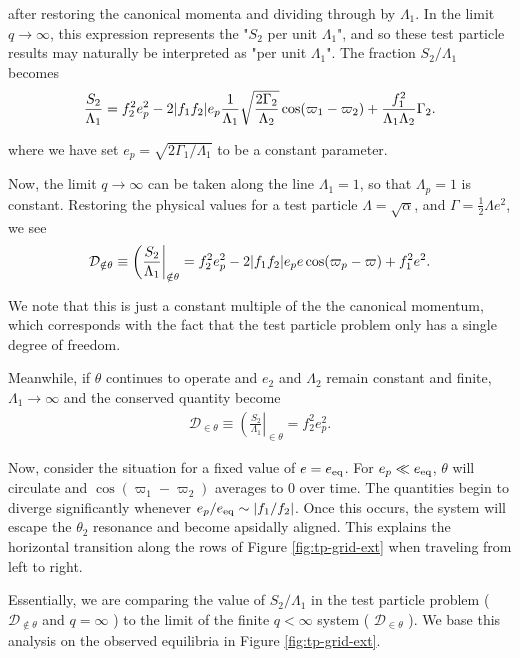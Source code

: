 \documentclass[usenatbib,onecolumn]{mnras}
\DeclarePairedDelimiter{\abs}{|}{|}
\begin{document}
\noindent after restoring the canonical momenta and dividing
through by \(\Lambda_1\).  In the limit \(q\to\infty\), this expression
represents the "\(S_2\) per unit \(\Lambda_1\)", and so these test particle
results may naturally be interpreted as "per unit \(\Lambda_1\)".  The
fraction \(S_2/\Lambda_1\) becomes
\begin{align}
  \frac{S_2}{\Lambda_1} = f_2^2e_p^2
  -2\abs{f_1f_2}e_p
  \frac{1}{\Lambda_1}
  \sqrt{\frac{2\Gamma_2}{\Lambda_2}}\cos(\varpi_1-\varpi_2)
  + \frac{f_1^2}{\Lambda_1\Lambda_2}\Gamma_2.
\end{align}

\noindent
where we have set \(e_p = \sqrt{2\Gamma_1/\Lambda_1}\) to be a constant
parameter. 

Now, the limit \(q\to\infty\) can be taken along the line \(\Lambda_1 =
1\), so that \(\Lambda_p = 1\) is constant.  Restoring the physical
values for a test particle \(\Lambda=\sqrt{\alpha}\), and
\(\Gamma=\frac12\Lambda e^2\), we see
\begin{align}
    \label{eq:tpcons}
\mathcal{D}_{\notin\theta}\equiv 
    \left(\frac{S_2}{\Lambda_1}\right|_{\notin\theta} = f_2^2e_p^2
    -2\abs{f_1f_2}e_p e\cos(\varpi_p-\varpi) + f_1^2e^2.
  \end{align}

\noindent We note that this is just a constant multiple of
the the canonical momentum, which corresponds with the fact that the
test particle problem only has a single degree of freedom.

Meanwhile, if \(\theta\) continues to operate and \(e_2\) and \(\Lambda_2\)
remain constant and finite, \(\Lambda_1\to\infty\) and the conserved
quantity become
\begin{align}
    \label{eq:tpcons}
\mathcal{D}_{\in\theta}\equiv 
    \left(\frac{S_2}{\Lambda_1}\right|_{\in\theta} = f_2^2e_p^2.
  \end{align}

\noindent

Now, consider the situation for a fixed value of \(e=e_{\rm eq}\).  For
\(e_p\ll e_{\rm eq}\), \(\theta\) will circulate and
\(\cos(\varpi_1-\varpi_2)\) averages to 0 over time.  The quantities
begin to diverge significantly whenever \(e_p/e_{\rm eq}\sim
\abs{f_1/f_2}\). Once this occurs, the system will escape the
\(\theta_2\) resonance and become apsidally aligned.  This explains the
horizontal transition along the rows of Figure \ref{fig:tp-grid-ext}
when traveling from left to right.

Essentially, we are comparing the value of \(S_2/\Lambda_1\) in the test
particle problem ( \(\mathcal{D}_{\notin\theta}\) and \(q=\infty\) ) to
the limit of the finite \(q<\infty\) system ( \(\mathcal{D}_{\in\theta}\)
). We base this analysis on the observed equilibria in Figure
\ref{fig:tp-grid-ext}. 
\end{document}
